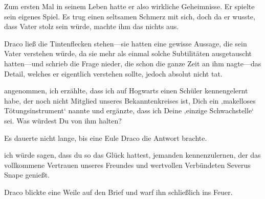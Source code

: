 Zum ersten Mal in seinem Leben hatte er also wirkliche Geheimnisse. Er spielte sein eigenes Spiel. Es trug einen seltsamen Schmerz mit sich, doch da er wusste, dass Vater stolz sein würde, machte ihm das nichts aus.

Draco ließ die Tintenflecken stehen—sie hatten eine gewisse Aussage, die sein Vater verstehen würde, da sie mehr als einmal solche Subtilitäten ausgetauscht hatten—und schrieb die Frage nieder, die schon die ganze Zeit an ihm nagte—das Detail, welches er eigentlich verstehen sollte, jedoch absolut nicht tat.

\begin{writtenNote}

angenommen, ich erzählte, dass ich auf Hogwarts einen Schüler kennengelernt habe, der noch nicht Mitglied unseres Bekanntenkreises ist, Dich ein ‚makelloses Tötungsinstrument‘ nannte und ergänzte, dass ich Deine ‚einzige Schwachstelle‘ sei. Was würdest Du von ihm halten?
\end{writtenNote}

Es dauerte nicht lange, bis eine Eule Draco die Antwort brachte.

\begin{writtenNote}

ich würde sagen, dass du so das Glück hattest, jemanden kennenzulernen, der das vollkommene Vertrauen unseres Freundes und wertvollen Verbündeten Severus Snape genießt.
\end{writtenNote}

Draco blickte eine Weile auf den Brief und warf ihn schließlich ins Feuer.


